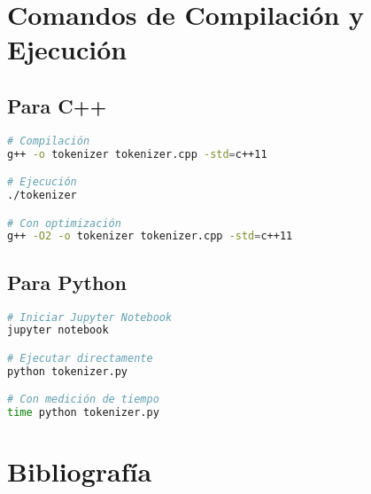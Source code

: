 \documentclass[12pt,a4paper]{article}
\begin{document}
\newpage

\section{Comandos de Compilación y Ejecución}

\subsection{Para C++}

\begin{lstlisting}[language=bash, caption=Compilación y ejecución del tokenizador en C++]
# Compilación
g++ -o tokenizer tokenizer.cpp -std=c++11

# Ejecución
./tokenizer

# Con optimización
g++ -O2 -o tokenizer tokenizer.cpp -std=c++11
\end{lstlisting}

\subsection{Para Python}

\begin{lstlisting}[language=bash, caption=Ejecución de los notebooks de Python]
# Iniciar Jupyter Notebook
jupyter notebook

# Ejecutar directamente
python tokenizer.py

# Con medición de tiempo
time python tokenizer.py
\end{lstlisting}

\newpage

\section{Bibliografía}
\end{document}
